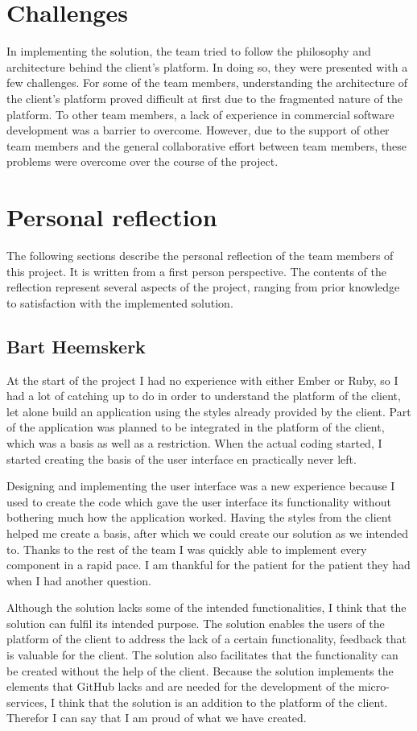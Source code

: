 \section{Challenges}
In implementing the solution, the team tried to follow the philosophy and architecture behind the client's platform. In doing so, they were presented with a few challenges. For some of the team members, understanding the architecture of the client's platform proved difficult at first due to the fragmented nature of the platform. To other team members, a lack of experience in commercial software development was a barrier to overcome. However, due to the support of other team members and the general collaborative effort between team members, these problems were overcome over the course of the project.

\section{Personal reflection}
The following sections describe the personal reflection of the team members of this project. It is written from a first person perspective. The contents of the reflection represent several aspects of the project, ranging from prior knowledge to satisfaction with the implemented solution.

\subsection{Bart Heemskerk}
At the start of the project I had no experience with either Ember or Ruby, so I had a lot of catching up to do in order to understand the platform of the client, let alone build an application using the styles already provided by the client. Part of the application was planned to be integrated in the platform of the client, which was a basis as well as a restriction. When the actual coding started, I started creating the basis of the user interface en practically never left.

Designing and implementing the user interface was a new experience because I used to create the code which gave the user interface its functionality without bothering much how the application worked. Having the styles from the client helped me create a basis, after which we could create our solution as we intended to. Thanks to the rest of the team I was quickly able to implement every component in a rapid pace. I am thankful for the patient for the patient they had when I had another question.

Although the solution lacks some of the intended functionalities, I think that the solution can fulfil its intended purpose. The solution enables the users of the platform of the client to address the lack of a certain functionality, feedback that is valuable for the client. The solution also facilitates that the functionality can be created without the help of the client. Because the solution implements the elements that GitHub lacks and are needed for the development of the micro-services, I think that the solution is an addition to the platform of the client. Therefor I can say that I am proud of what we have created.

